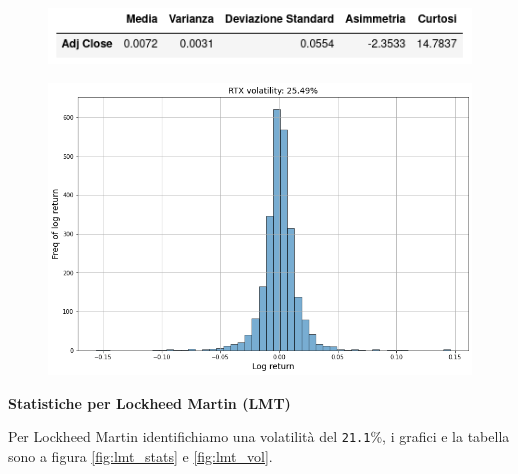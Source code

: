 \documentclass{article}
\begin{document}
\begin{figure}[h]
  \centering
  \begin{minipage}{.5\textwidth}
    \centering
    \vspace{4.85cm}
    \includegraphics[width=1\linewidth]{rtx_stats.png}
    \label{fig:rtx_stats}
  \end{minipage}%
  \begin{minipage}{.5\textwidth}
    \centering
    \includegraphics[width=1\linewidth]{rtx_volatility.png}
    \label{fig:rtx_vol}
  \end{minipage}
\end{figure}

\textbf{Statistiche per Lockheed Martin (LMT)}

Per Lockheed Martin identifichiamo una volatilità del \verb|21.1|\%, i grafici e la tabella sono a figura \ref{fig:lmt_stats} e \ref{fig:lmt_vol}.
\end{document}
